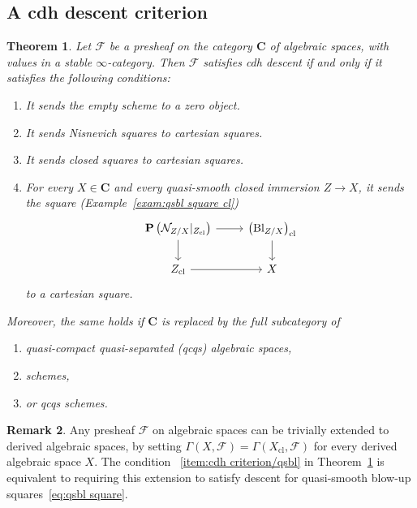 \documentclass[11pt]{article}
\newtheorem{theo}{Theorem}[section]
\theoremstyle{definition}
\newtheorem{rema}[theo]{Remark}
\numberwithin{equation}{section}
\numberwithin{figure}{section}
\numberwithin{table}{section}
\newcommand{\sF}{\ensuremath{\mathcal{F}}\xspace}
\newcommand{\sN}{\ensuremath{\mathcal{N}}\xspace}
\newcommand{\bC}{\ensuremath{\mathbf{C}}\xspace}
\newcommand{\bP}{\ensuremath{\mathbf{P}}\xspace}
\newcommand{\cl}{{\mrm{cl}}}
\renewcommand{\P}{\bP}
\DeclareMathOperator{\Bl}{Bl}
\newcommand{\mrm}[1]{\ensuremath{\mathrm{#1}}\xspace}
\newcommand*{\romanenumi}{\renewcommand*{\theenumi}{\roman{enumi}}}
\newcommand*{\alphenumi}{\renewcommand*{\theenumi}{\alph{enumi}}}
\begin{document}
\subsection{A cdh descent criterion}

\begin{theo}\label{thm:cdh criterion}
Let $\sF$ be a presheaf on the category $\bC$ of algebraic spaces, with values in a stable $\infty$-category. Then $\sF$ satisfies cdh descent if and only if it satisfies the following conditions:
\begin{enumerate}\romanenumi
\item\label{item:cdh criterion/reduced}
It sends the empty scheme to a zero object.
\item\label{item:cdh criterion/Nis}
It sends Nisnevich squares to cartesian squares.
\item\label{item:cdh criterion/closed}
It sends closed squares to cartesian squares.
\item\label{item:cdh criterion/qsbl}
For every $X\in\bC$ and every quasi-smooth closed immersion $Z \to X$, it sends the square (Example~\ref{exam:qsbl square cl})
\[
\begin{tikzcd}
\P\left(\sN_{Z/X}|_{Z_\cl}\right) \ar{r}\ar{d} & \left(\Bl_{Z/X}\right)_\cl \ar{d}
\\
Z_\cl \ar{r} & X
\end{tikzcd}
\]
to a cartesian square.
\end{enumerate} Moreover, the same holds if $\bC$ is replaced by the full subcategory of
\begin{enumerate}\alphenumi
\item quasi-compact quasi-separated (qcqs) algebraic spaces,
\item schemes,
\item or qcqs schemes.
\end{enumerate}
\end{theo}

\begin{rema}\label{rem:trivial extension to dass}
Any presheaf $\sF$ on algebraic spaces can be trivially extended to derived algebraic spaces, by setting $\Gamma(X, \sF) = \Gamma(X_\cl, \sF)$ for every derived algebraic space $X$. The condition~
\eqref{item:cdh criterion/qsbl} in Theorem~\ref{thm:cdh criterion} is equivalent to requiring this extension to satisfy descent for quasi-smooth blow-up squares~\eqref{eq:qsbl square}.
\end{rema}
\end{document}
